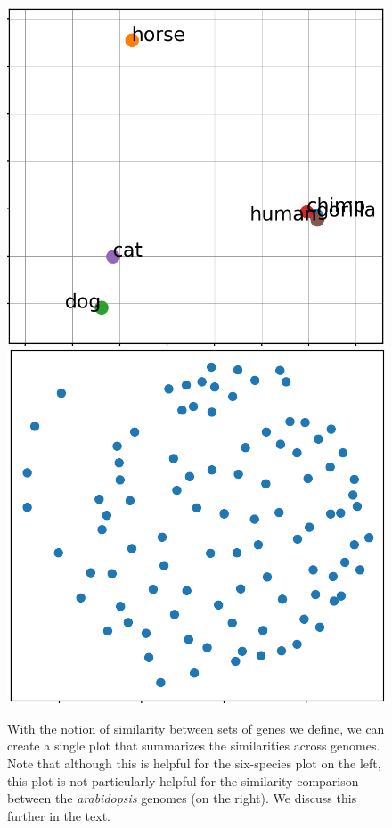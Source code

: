 \documentclass{vgtc}                      %
\begin{document}
\begin{figure}[t]
 \centering
 \includegraphics[width=0.48\columnwidth]{synmap_n}
 \includegraphics[width=0.46\columnwidth]{chr_all_scatter}
 \caption{With the notion of similarity between sets of genes we define, we can create a single plot that summarizes the similarities across genomes. Note that although this is helpful for the six-species plot on the left, this plot is not particularly helpful for the similarity comparison between the \emph{arabidopsis} genomes (on the right). We discuss this further in the text.}
 \label{fig:synmap_n}
\end{figure}


\end{document}
